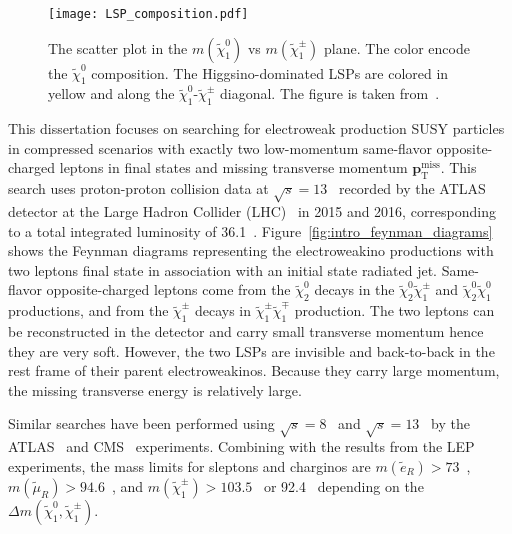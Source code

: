 \begin{figure}[htbp]
    \begin{center}
        \texttt{[image: LSP\_composition.pdf]}
        \caption{The scatter plot in the $m(\widetilde{\chi}^{0}_{1})$ vs $m(\widetilde{\chi}^{\pm}_{1})$ plane.
        The color encode the $\widetilde{\chi}^{0}_{1}$ composition.
        The Higgsino-dominated LSPs are colored in yellow and along the $\widetilde{\chi}^{0}_{1}$-$\widetilde{\chi}^{\pm}_{1}$ diagonal.
        The figure is taken from~\cite{Aaboud:2016wna}.}
        \label{fig:intro_LSP_composition}
    \end{center}
\end{figure}

This dissertation focuses on searching for electroweak production SUSY particles in compressed scenarios with exactly two low-momentum same-flavor opposite-charged leptons in final states and missing transverse momentum $\textbf{p}_{\text{T}}^{\text{miss}}$.
This search uses proton-proton collision data at $\sqrt{s} = 13$~{\TeV} recorded by the ATLAS detector at the Large Hadron Collider (LHC)~\cite{Evans:2008zzb} in 2015 and 2016, corresponding to a total integrated luminosity of 36.1~\ifb.
Figure~\ref{fig:intro_feynman_diagrams} shows the Feynman diagrams representing the electroweakino productions with two leptons final state in association with an initial state radiated jet.
Same-flavor opposite-charged leptons come from the $\widetilde{\chi}^{0}_{2}$ decays in the $\widetilde{\chi}^{0}_{2} \widetilde{\chi}^{\pm}_{1}$ and $\widetilde{\chi}^{0}_{2} \widetilde{\chi}^{0}_{1}$ productions, and from the $\widetilde{\chi}^{\pm}_{1}$ decays in $\widetilde{\chi}^{\pm}_{1} \widetilde{\chi}^{\mp}_{1}$ production.
The two leptons can be reconstructed in the detector and carry small transverse momentum  \pt hence they are very soft.
However, the two LSPs are invisible and back-to-back in the rest frame of their parent electroweakinos.
Because they carry large momentum, the missing transverse energy \met is relatively large.

Similar searches have been performed using $\sqrt{s} = 8$~{\TeV} and $\sqrt{s} = 13$~{\TeV} by the ATLAS~\cite{Aad:2014vma, Aad:2014nua, Aad:2015eda, Aaboud:2016wna} and CMS~\cite{Khachatryan:2014qwa, Khachatryan:2015pot, Sirunyan:2017lae} experiments.
Combining with the results from the LEP experiments, the mass limits for sleptons and charginos are $m(\widetilde{e}_{R}) > 73$~{\GeV}, $m(\widetilde{\mu}_{R}) > 94.6$~{\GeV}, and $m(\widetilde{\chi}^{\pm}_{1}) > 103.5$~{\GeV} or 92.4~{\GeV} depending on the $\Delta m(\widetilde{\chi}^{0}_{1}, \widetilde{\chi}^{\pm}_{1})$.

